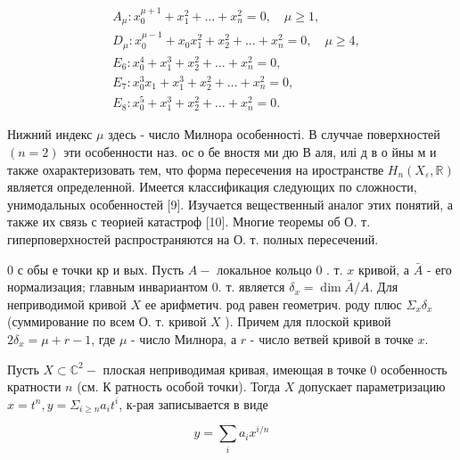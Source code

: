 \documentclass[10pt]{article}
\begin{document}
\[

\begin{aligned}

& A_{\mu}: x_{0}^{\mu+1}+x_{1}^{2}+\ldots+x_{n}^{2}=0, \quad \mu \geqslant 1, \\

& D_{\mu}: x_{0}^{\mu-1}+x_{0} x_{1}^{2}+x_{2}^{2}+\ldots+x_{n}^{2}=0, \quad \mu \geqslant 4, \\

& E_{6}: x_{0}^{4}+x_{1}^{3}+x_{2}^{2}+\ldots+x_{n}^{2}=0, \\

& E_{7}: x_{0}^{3} x_{1}+x_{1}^{3}+x_{2}^{2}+\ldots+x_{n}^{2}=0, \\

& E_{8}: x_{0}^{5}+x_{1}^{3}+x_{2}^{2}+\ldots+x_{n}^{2}=0 .

\end{aligned}

\]



Нижний индекс $\mu$ здесь - число Милнора особенності. В случчае поверхностей $(n=2)$ эти особенности наз. ос о бе вностя ми дю В аля, илі д в о йны м и также охарактеризовать тем, что форма пересечения на иространстве $H_{n}\left(X_{\varepsilon}, \mathbb{R}\right)$ является определенной. Имеется классификация следующих по сложности, унимодальных особенностей [9]. Изучается вещественный аналог этих понятий, а также их связь с теорией катастроф [10]. Многие теоремы об О. т. гиперповерхностей распространяются на О. т. полных пересечений.



0 с обы е точки кр и вых. Пусть $A-$ локальное кольцо 0 . т. $x$ кривой, а $\bar{A}$ - его нормализация; главным инвариантом 0. т. является $\delta_{x}=\operatorname{dim} \bar{A} / A$. Для неприводимой кривой $X$ ее арифметич. род равен геометрич. роду плюс $\Sigma_{x} \delta_{x}$ (суммирование по всем О. т. кривой $X$ ). Причем для плоской кривой $2 \delta_{x}=\mu+r-1$, где $\mu$ - число Милнора, а $r$ - число ветвей кривой в точке $x$.



Пусть $X \subset \mathbb{C}^{2}-$ плоская неприводимая кривая, имеющая в точке 0 особенность кратности $n$ (см. К ратность особой точки). Тогда $X$ допускает параметризацию $x=t^{n}, y=\Sigma_{i \geqslant n} a_{i} t^{i}$, к-рая записывается в виде



\[

y=\sum_{i} a_{i} x^{i / n}

\]
\end{document}
